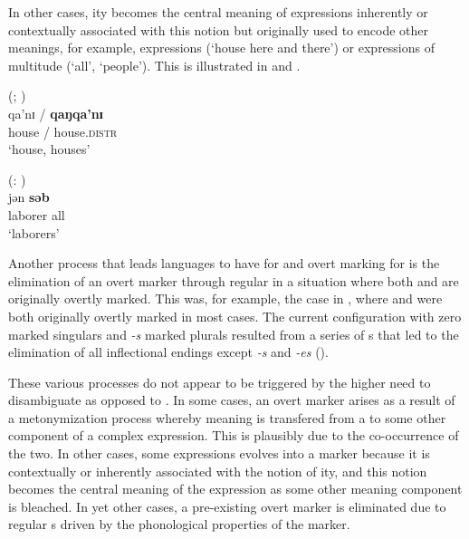 \documentclass[output=paper]{langsci/langscibook}
\begin{document}
\z
\z


In other cases, ity becomes the central meaning of expressions
inherently or contextually
associated with this notion but originally used to encode other meanings, for example,  expressions
(`house here and there') or expressions of multitude (`all', `people'). This is illustrated in  and .

\ea\label{paiute}
 (; \citealt[258]{Sapir1930})\\
\gll qa'nɪ​ / \textbf{{qaŋqa'nɪ​}}\\
house / house.\textsc{distr}\\
\glt `house, houses' 

\z

\ea\label{maithili}
 (: )\\
\gll jən \textbf{{səb}}\\
laborer all\\
\glt `laborers'

\z

Another process that leads languages to have  for 
and overt marking for  is the elimination of an overt 
marker through regular  in a situation where both 
and  are originally overtly marked. This was, for example, the case in
, where  and  were both originally overtly
  marked in most cases. The current
configuration with zero marked singulars and {\em -s} marked plurals
resulted from a series of s that led to the
elimination of all inflectional endings except   {\em
  -s} and  {\em -es} (\citealt{Mosse}). 


These various processes do not appear to be triggered by the higher need to
disambiguate  as opposed to . In some cases, an overt
 marker arises as a result of a metonymization
process whereby  meaning is transfered from a  to some
other component of a complex expression. This is plausibly due to the
co-occurrence of the two. In other cases, some
expressions evolves into a  marker because it is contextually or
inherently associated with the notion of ity, and this notion becomes the
central meaning of the expression as some other meaning component is
bleached. In yet
other cases, a pre-existing overt  marker is eliminated due to
regular s driven by the phonological properties of the
marker. 
\end{document}
